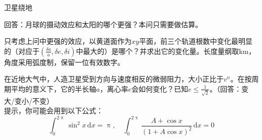 \documentclass[answer]{cphos}
\begin{document}
\begin{problem}[50]{卫星绕地}
\begin{problemstatement}
回答：月球的摄动效应和太阳的哪个更强？本问只需要做估算。

只考虑上问中更强的效应，以黄道面作为$xy$平面，前三个轨道根数中变化最明显的（对应于$\left(\frac{\delta a}{a}, \delta e, \delta i\right)$中最大的）是哪个？并求出它的变化量。长度量纲取$\text{km}$，角度采用弧度制，保留一位有效数字。

 在近地大气中，人造卫星受到方向与速度相反的微弱阻力，大小正比于$v ^n$。在按周期平均的意义下，它的半长轴$a$，离心率$e$会如何变化？已知$e\leq\frac{1}{\sqrt{2}}$。（回答：变大/变小/不变）\\

\noindent 提示，你可能会用到以下公式：
\begin{equation}
	\int_{0}^{2\uppi}\sin^2 x \,\mathrm{d}x=\uppi,\quad
	\int_{0}^{2\uppi}\frac{A+\cos x}{\left(1+A\cos x\right)^2}\,\mathrm{d}x=0
\end{equation}

\end{problemstatement}


\begin{solution}


\end{solution}
\end{problem}
\end{document}
